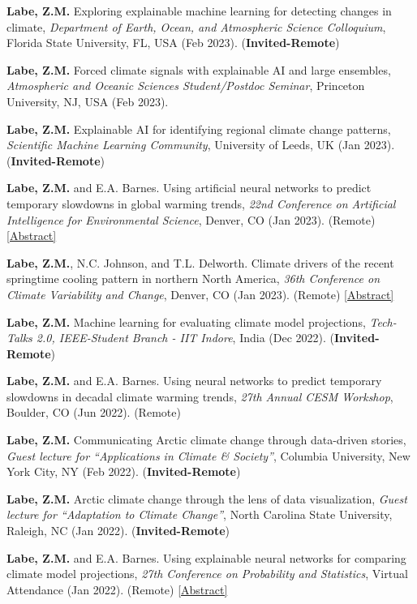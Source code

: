 \documentclass[margin,line,palatino,courier,10pt]{res}
\begin{document}
\begin{resume}
\begin{etaremune}[leftmargin=0in,topsep=0in,parsep=0in]
\item \textbf{Labe, Z.M.} Exploring explainable machine learning for detecting changes in climate, \textit{Department of Earth, Ocean, and Atmospheric Science Colloquium}, Florida State University, FL, USA (Feb 2023). (\textbf{Invited-Remote})
\item \textbf{Labe, Z.M.} Forced climate signals with explainable AI and large ensembles, \textit{Atmospheric and Oceanic Sciences Student/Postdoc Seminar}, Princeton University, NJ, USA (Feb 2023).
\item \textbf{Labe, Z.M.} Explainable AI for identifying regional climate change patterns, \textit{Scientific Machine Learning Community}, University of Leeds, UK (Jan 2023). (\textbf{Invited-Remote})
\item \textbf{Labe, Z.M.} and E.A. Barnes. Using artificial neural networks to predict temporary slowdowns in global warming trends, \textit{22nd Conference on Artificial Intelligence for Environmental Science}, Denver, CO (Jan 2023). (Remote) \href{https://ams.confex.com/ams/103ANNUAL/meetingapp.cgi/Paper/415460}{[Abstract]}
\item \textbf{Labe, Z.M.}, N.C. Johnson, and T.L. Delworth. Climate drivers of the recent springtime cooling pattern in northern North America, \textit{36th Conference on Climate Variability and Change}, Denver, CO (Jan 2023). (Remote) \href{https://ams.confex.com/ams/103ANNUAL/meetingapp.cgi/Paper/415409}{[Abstract]}
\item \textbf{Labe, Z.M.} Machine learning for evaluating climate model projections, \textit{Tech-Talks 2.0, IEEE-Student Branch - IIT Indore}, India (Dec 2022). (\textbf{Invited-Remote})
\item \textbf{Labe, Z.M.} and E.A. Barnes. Using neural networks to predict temporary slowdowns in decadal climate warming trends, \textit{27th Annual CESM Workshop}, Boulder, CO (Jun 2022). (Remote)
\item \textbf{Labe, Z.M.} Communicating Arctic climate change through data-driven stories, \textit{Guest lecture for ``Applications in Climate \& Society''}, Columbia University, New York City, NY (Feb 2022). (\textbf{Invited-Remote}) 
\item \textbf{Labe, Z.M.} Arctic climate change through the lens of data visualization, \textit{Guest lecture for ``Adaptation to Climate Change''}, North Carolina State University, Raleigh, NC (Jan 2022). (\textbf{Invited-Remote}) 
\item \textbf{Labe, Z.M.} and E.A. Barnes. Using explainable neural networks for comparing climate model projections, \textit{27th Conference on Probability and Statistics}, Virtual Attendance (Jan 2022). (Remote) \href{https://ams.confex.com/ams/102ANNUAL/meetingapp.cgi/Paper/392538}{[Abstract]}

\end{etaremune}
\end{resume}
\end{document}
